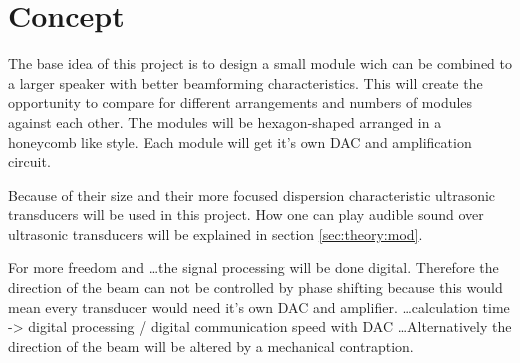 \chapter{Concept}


The base idea of this project is to design a small module wich can be combined to a larger speaker with better beamforming characteristics. This will create the opportunity to compare for different arrangements and numbers of modules against each other. The modules will be hexagon-shaped arranged in a honeycomb like style. Each module will get it's own DAC and amplification circuit.

Because of their size and their more focused dispersion characteristic ultrasonic transducers will be used in this project. How one can play audible sound over ultrasonic transducers will be explained in section \ref{sec:theory:mod}.

For more freedom and \dots the signal processing will be done digital. Therefore the direction of the beam can not be controlled by phase shifting because this would mean every transducer would need it's own DAC and amplifier. \dots calculation time -> digital processing / digital communication speed with DAC \dots Alternatively the direction of the beam will be altered by a mechanical contraption.